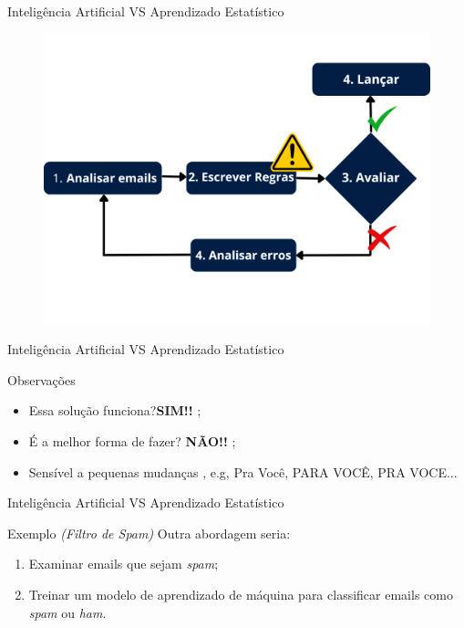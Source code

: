 \begin{frame}{Inteligência Artificial VS Aprendizado Estatístico}
	\begin{figure}[h]
		\includegraphics[scale=0.4]{imagens//secao1/tradicionalspam.png}
	\end{figure}
\end{frame}


\begin{frame}{Inteligência Artificial VS Aprendizado Estatístico}
	\begin{block}{Observações}
		\begin{itemize}
			\item Essa solução funciona?\pause \textbf{SIM!!} ;
			\pause 
			\item É a melhor forma de fazer? \pause \textbf{NÃO!!} ;
			\item Sensível a pequenas mudanças \pause, e.g, Pra Você, PARA VOCÊ, PRA VOCE...
		\end{itemize}
	\end{block}
\end{frame}

\begin{frame}{Inteligência Artificial VS Aprendizado Estatístico}
	\begin{block}{Exemplo \textit{(Filtro de Spam)}}
		\justifying
		Outra abordagem seria:
		\begin{enumerate}
			\justifying
			\item Examinar emails que sejam \textit{spam};
			\pause
			\item Treinar um modelo de aprendizado de máquina para classificar emails como \textit{spam} ou \textit{ham}.
		\end{enumerate}
	\end{block}
\end{frame}

